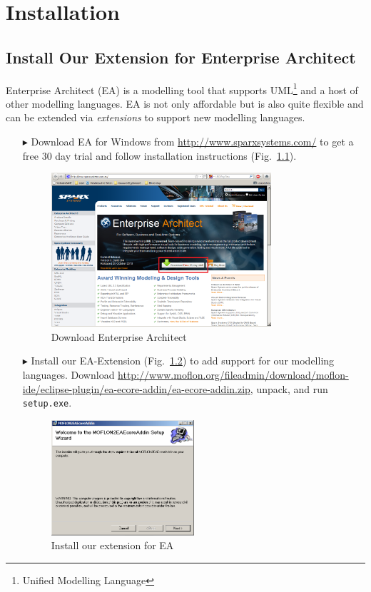 \chapter{Installation}
\label{chap:installation}

\section{Install Our Extension for Enterprise Architect}
Enterprise Architect (EA) is a modelling tool that supports UML\footnote{Unified Modelling Language} and a host of other modelling languages.
EA is not only affordable but is also quite flexible and can be extended via \emph{extensions} to support new modelling languages.
\begin{enumerate}
\item[$\blacktriangleright$] Download EA for Windows from \url{http://www.sparxsystems.com/} to get a free 30 day trial and follow installation instructions (Fig.~\ref{fig_enterpriseArchitextHomepage}).

\begin{figure}[htbp]
	\centering
  	\includegraphics[width=0.77\textwidth]{pics/installationAndSetup/ea_download.png}
	\caption{Download Enterprise Architect}
	\label{fig_enterpriseArchitextHomepage}
\end{figure} 

\item[$\blacktriangleright$] Install our EA-Extension (Fig.~\ref{fig_eaPluginWizard}) to add support for our modelling languages.
Download \url{http://www.moflon.org/fileadmin/download/moflon-ide/eclipse-plugin/ea-ecore-addin/ea-ecore-addin.zip}, unpack, and run \texttt{setup.exe}.

\begin{figure}[htbp]
	\centering
  \includegraphics[width=0.5\textwidth]{pics/installationAndSetup/eaplugin_install.png}
	\caption{Install our extension for EA}
	\label{fig_eaPluginWizard}
\end{figure}
\end{enumerate}
 
